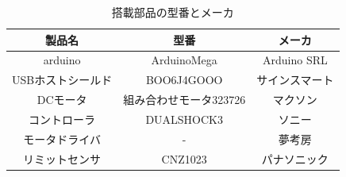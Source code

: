 \begin{table}[!htb]
 \begin{center}
  \caption{搭載部品の型番とメーカ}
  \begin{tabular}[htbp]{|c|c|c|}
   \hline
   製品名&型番&メーカ \\
   \hline
   arduino&ArduinoMega&Arduino SRL\\
   \hline
   USBホストシールド&BOO6J4GOOO&サインスマート\\
   \hline
   DCモータ&組み合わせモータ323726&マクソン\\
   \hline
   コントローラ&DUALSHOCK3&ソニー\\
   \hline
   モータドライバ&-&夢考房\\
   \hline
   リミットセンサ&CNZ1023&パナソニック\\
   \hline
  \end{tabular}
  \label{tab:parts}
 \end{center}
\end{table}